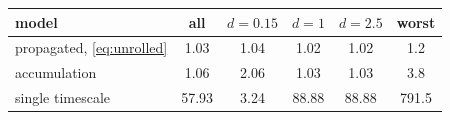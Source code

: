 \footnotesize
\setlength{\tabcolsep}{3.5pt}
\begin{tabular}{@{}lccccc@{}}
\toprule
model & all & $d = 0.15$ & $d = 1$ & $d = 2.5$ & worst \\
\midrule
propagated, \eqref{eq:unrolled} & 1.03 & 1.04 & 1.02 & 1.02 & 1.2 \\
accumulation & 1.06 & 2.06 & 1.03 & 1.03 & 3.8 \\
single timescale & 57.93 & 3.24 & 88.88 & 88.88 & 791.5 \\
\bottomrule
\end{tabular}